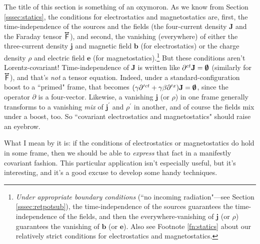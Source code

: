 \documentclass[12pt]{article}
\renewcommand{\vv}[1]{\mathbf{#1}}
\newcommand{\tightoverset}[2]{%
  \mathop{#2}\limits^{\vbox to -.5ex{\kern-0.75ex\hbox{$#1$}\vss}}}
\newcommand{\inlinedy}[1]{\tightoverset{\text{\tiny$\bm\leftrightarrow$}}{#1}}
\begin{document}
The title of this section is something of an oxymoron. As we know from Section \ref{sssec:statics}, the conditions for electrostatics and magnetostatics are, first, the time-independence of the sources and the fields (the four-current density $\vv J$ and the Faraday tensor $\inlinedy{\mathsf{F}}$), and second, the vanishing (everywhere) of either the three-current density $\vv j$ and magnetic field $\vv b$ (for electrostatics) or the charge density $\rho$ and electric field $\vv e$ (for magnetostatics).\footnote{\emph{Under appropriate boundary conditions} (``no incoming radiation"---see Section \ref{sssec:retpotsub}), the time-independence of the sources guarantees the time-independence of the fields, and then the everywhere-vanishing of $\vv j$ (or $\rho$) guarantees the vanishing of $\vv b$ (or $\vv e$). Also see Footnote \ref{fn:statics} about our relatively strict conditions for electrostatics and magnetostatics.} But these conditions aren't Lorentz-covariant! Time-independence of $\vv J$ is written like $\partial^{ct} \vv J = \textrm{\mbox{\boldmath $\emptyset$}}$ (similarly for $\inlinedy{\mathsf{F}}$), and that's \emph{not} a tensor equation. Indeed, under a standard-configuration boost to a ``primed" frame, that becomes ${(\gamma \partial^{\mkern.5mu \prime \mkern1mu ct} + \gamma \beta \partial^{\mkern.5mu \prime \mkern1mu x}) \vv J = \textrm{\mbox{\boldmath $\emptyset$}}}$, since the operator $\partialup$ is a four-vector. Likewise, a vanishing $\vv j$ (or $\rho$) in one frame generally transforms to a vanishing \emph{mix} of $\vv j ^\prime$ and $\rho ^\prime$ in another, and of course the fields mix under a boost, too. So ``covariant electrostatics and magnetostatics" should raise an eyebrow.

What I mean by it is: if the conditions of electrostatics or magnetostatics do hold in some frame, then we should be able to \emph{express} that fact in a manifestly covariant fashion. This particular application isn't especially useful, but it's interesting, and it's a good excuse to develop some handy techniques.
\end{document}
